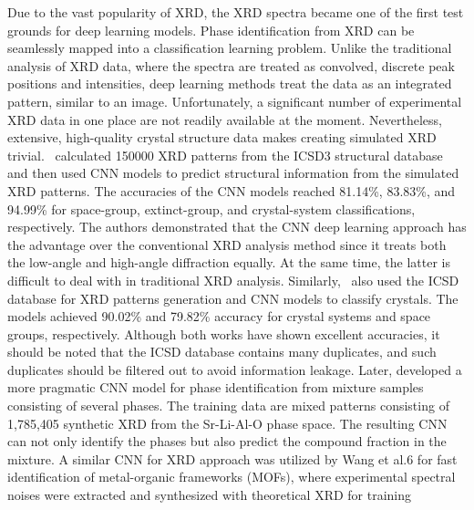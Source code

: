 \documentclass[pdflatex,sn-mathphys]{sn-jnl}%
\theoremstyle{thmstyleone}%
\theoremstyle{thmstyletwo}%
\theoremstyle{thmstylethree}%
\begin{document}
Due to the vast popularity of XRD, the XRD spectra became one of the first test grounds for deep learning models. Phase identification from XRD can be seamlessly mapped into a classification learning problem. Unlike the traditional analysis of XRD data, where the spectra are treated as convolved, discrete peak positions and intensities, deep learning methods treat the data as an integrated pattern, similar to an image. Unfortunately, a significant number of experimental XRD data in one place are not readily available at the moment. Nevertheless, extensive, high-quality crystal structure data makes creating simulated XRD trivial.~\cite{Park.2} calculated 150000 XRD patterns from the ICSD3 structural database~\cite{icsd} and then used CNN models to predict structural information from the simulated XRD patterns. The accuracies of the CNN models reached 81.14\%, 83.83\%, and 94.99\% for space-group, extinct-group, and crystal-system classifications, respectively. The authors demonstrated that the CNN deep learning approach has the advantage over the conventional XRD analysis method since it treats both the low-angle and high-angle diffraction equally. At the same time, the latter is difficult to deal with in traditional XRD analysis.
Similarly,~\cite{Zaloga.4} also used the ICSD database for XRD patterns generation and CNN models to classify crystals. The models achieved 90.02\% and 79.82\% accuracy for crystal systems and space groups, respectively. Although both works have shown excellent accuracies, it should be noted that the ICSD database contains many duplicates, and such duplicates should be filtered out to avoid information leakage. Later, \cite{Lee.5} developed a more pragmatic CNN model for phase identification from mixture samples consisting of several phases. The training data are mixed patterns consisting of 1,785,405 synthetic XRD from the Sr-Li-Al-O phase space. The resulting CNN can not only identify the phases but also predict the compound fraction in the mixture. A similar CNN for XRD approach was utilized by Wang et al.6 for fast identification of metal-organic frameworks (MOFs), where experimental spectral noises were extracted and synthesized with theoretical XRD for training 
\end{document}
